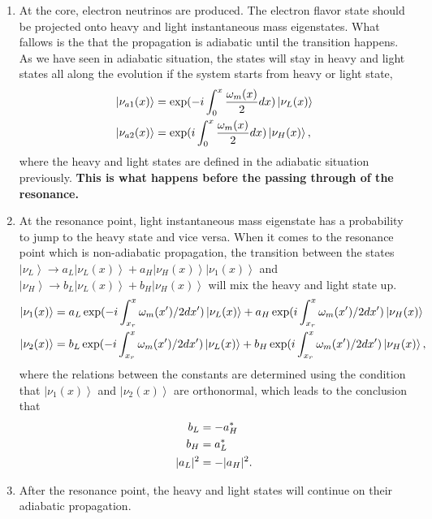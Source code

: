 \documentclass[letterpaper,12pt,english]{sphinxmanual}
\newcommand{\ket}[1]{\left| #1\right\rangle}
\begin{document}
\begin{enumerate}
\item {} 
At the core, electron neutrinos are produced. The electron flavor state should be projected onto heavy and light instantaneous mass eigenstates. What fallows is the that the propagation is adiabatic until the transition happens.
As we have seen in adiabatic situation, the states will stay in heavy and light states all along the evolution if the system starts from heavy or light state,
\begin{gather}
\begin{split}\ket{\nu_{a1}(x)} &= \exp(-i \int_0^x \frac{\omega_m(x)}{2} dx )  \ket{\nu_L(x)} \\
\ket{\nu_{a2}(x)} &= \exp(i\int_0^x \frac{\omega_m(x)}{2} dx) \ket{\nu_H(x)},\end{split}\notag
\end{gather}
where the heavy and light states are defined in the adiabatic situation previously. \textbf{This is what happens before the passing through of the resonance.}

\item {} 
At the resonance point, light instantaneous mass eigenstate has a probability to jump to the heavy state and vice versa.
When it comes to the resonance point which is non-adiabatic propagation, the transition between the states \(\ket{\nu_L}\to a_L \ket{\nu_L(x)} + a_H \ket{\nu_H(x)} \ket{\nu_1(x)}\) and \(\ket{\nu_H}\to b_L \ket{\nu_L(x)} + b_H \ket{\nu_H(x)}\) will mix the heavy and light state up.
\begin{gather}
\begin{split}\ket{\nu_1(x)} &= a_L \exp(-i \int_{x_r}^x \omega_m(x')/2 dx' )  \ket{\nu_L(x)} + a_H \exp(i\int_{x_r}^x \omega_m(x')/2 dx') \ket{\nu_H(x)}  \\
\ket{\nu_2(x)} &= b_L \exp(-i \int_{x_r}^x \omega_m(x')/2 dx' )  \ket{\nu_L(x)} + b_H \exp(i\int_{x_r}^x \omega_m(x')/2 dx') \ket{\nu_H(x)},\end{split}\notag
\end{gather}
where the relations between the constants are determined using the condition that \(\ket{\nu_1(x)}\) and \(\ket{\nu_2(x)}\) are orthonormal, which leads to the conclusion that
\begin{gather}
\begin{split}b_L &= -a_H^* \\
b_H &= a_L^* \\
\lvert a_L \rvert^2 &=  - \lvert a_H \rvert^2 .\end{split}\notag
\end{gather}
\item {} 
After the resonance point, the heavy and light states will continue on their adiabatic propagation.

\end{enumerate}
\end{document}
